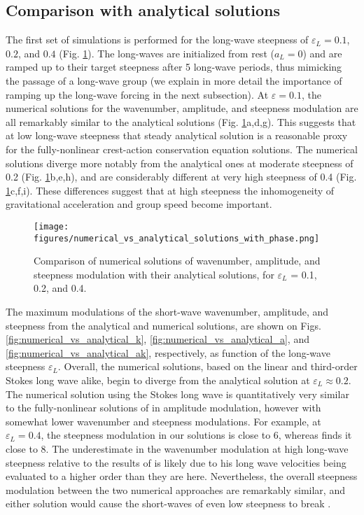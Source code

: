 \documentclass[lineno]{jfm}
\begin{document}
\subsection{Comparison with analytical solutions}
\label{subsection:comparison_with_analytical_solutions}

The first set of simulations is performed for the long-wave steepness of
$\varepsilon_L = 0.1$, $0.2$, and $0.4$ (Fig. \ref{fig:numerical_solutions}).
The long-waves are initialized from rest ($a_L = 0$) and are ramped up
to their target steepness after 5 long-wave periods, thus mimicking the
passage of a long-wave group
(we explain in more detail the importance of ramping up the long-wave forcing
in the next subsection).
At $\varepsilon = 0.1$, the numerical solutions for the wavenumber, amplitude,
and steepness modulation are all remarkably similar to the analytical solutions
(Fig. \ref{fig:numerical_solutions}a,d,g).
This suggests that at low long-wave steepness that steady analytical solution
is a reasonable proxy for the fully-nonlinear crest-action conservation
equation solutions.
The numerical solutions diverge more notably from the analytical ones at
moderate steepness of 0.2 (Fig. \ref{fig:numerical_solutions}b,e,h), and are
considerably different at very high steepness of 0.4
(Fig. \ref{fig:numerical_solutions}c,f,i).
These differences suggest that at high steepness the inhomogeneity of
gravitational acceleration and group speed become important.

\begin{figure}
\centering
\texttt{[image: figures/numerical\_vs\_analytical\_solutions\_with\_phase.png]}
\caption{
  Comparison of numerical solutions of wavenumber, amplitude, and steepness modulation
  with their analytical solutions, for $\varepsilon_L$ = 0.1, 0.2, and 0.4.
}
\label{fig:numerical_solutions}
\end{figure}

The maximum modulations of the short-wave wavenumber, amplitude, and steepness
from the analytical and numerical solutions, are shown on Figs.
\ref{fig:numerical_vs_analytical_k},
\ref{fig:numerical_vs_analytical_a}, and
\ref{fig:numerical_vs_analytical_ak}, respectively, as function of the long-wave
steepness $\varepsilon_L$.
Overall, the numerical solutions, based on the linear and third-order Stokes long wave
alike, begin to diverge from the analytical solution at $\varepsilon_L \approx 0.2$.
The numerical solution using the Stokes long wave is quantitatively very similar
to the fully-nonlinear solutions of \citet{longuet1987propagation} in amplitude
modulation, however with somewhat lower wavenumber and steepness modulations.
For example, at $\varepsilon_L = 0.4$, the steepness modulation in our solutions
is close to 6, whereas \citet{longuet1987propagation} finds it close to 8.
The underestimate in the wavenumber modulation at high long-wave steepness
relative to the results of \citet{longuet1987propagation}
is likely due to his long wave velocities being evaluated to a higher order
than they are here.
Nevertheless, the overall steepness modulation between the two numerical
approaches are remarkably similar, and either solution would cause the
short-waves of even low steepness to break \citep{banner1993wave}.
\end{document}
